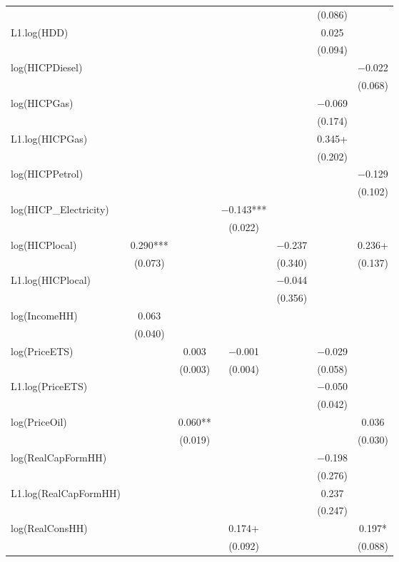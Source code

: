 \begin{table}
{\begin{tabular}[t]{lcccccc}
 &  &  &  &  & (\num{0.086}) & \\
L1.log(HDD) &  &  &  &  & \num{0.025} & \\
 &  &  &  &  & (\num{0.094}) & \\
log(HICPDiesel) &  &  &  &  &  & \num{-0.022}\\
 &  &  &  &  &  & (\num{0.068})\\
log(HICPGas) &  &  &  &  & \num{-0.069} & \\
 &  &  &  &  & (\num{0.174}) & \\
L1.log(HICPGas) &  &  &  &  & \num{0.345}+ & \\
 &  &  &  &  & (\num{0.202}) & \\
log(HICPPetrol) &  &  &  &  &  & \num{-0.129}\\
 &  &  &  &  &  & (\num{0.102})\\
log(HICP\_Electricity) &  &  & \num{-0.143}*** &  &  & \\
 &  &  & (\num{0.022}) &  &  & \\
log(HICPlocal) & \num{0.290}*** &  &  & \num{-0.237} &  & \num{0.236}+\\
 & (\num{0.073}) &  &  & (\num{0.340}) &  & (\num{0.137})\\
L1.log(HICPlocal) &  &  &  & \num{-0.044} &  & \\
 &  &  &  & (\num{0.356}) &  & \\
log(IncomeHH) & \num{0.063} &  &  &  &  & \\
 & (\num{0.040}) &  &  &  &  & \\
log(PriceETS) &  & \num{0.003} & \num{-0.001} &  & \num{-0.029} & \\
 &  & (\num{0.003}) & (\num{0.004}) &  & (\num{0.058}) & \\
L1.log(PriceETS) &  &  &  &  & \num{-0.050} & \\
 &  &  &  &  & (\num{0.042}) & \\
log(PriceOil) &  & \num{0.060}** &  &  &  & \num{0.036}\\
 &  & (\num{0.019}) &  &  &  & (\num{0.030})\\
log(RealCapFormHH) &  &  &  &  & \num{-0.198} & \\
 &  &  &  &  & (\num{0.276}) & \\
L1.log(RealCapFormHH) &  &  &  &  & \num{0.237} & \\
 &  &  &  &  & (\num{0.247}) & \\
log(RealConsHH) &  &  & \num{0.174}+ &  &  & \num{0.197}*\\
 &  &  & (\num{0.092}) &  &  & (\num{0.088})\\

\end{tabular}}
\end{table}
